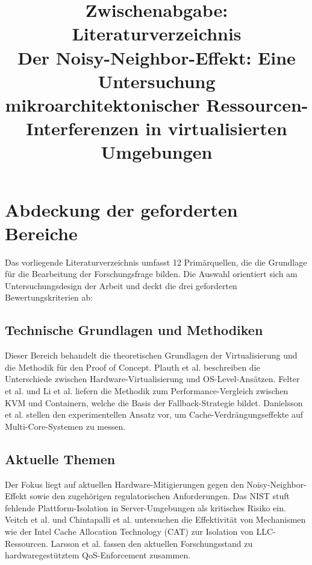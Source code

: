 \documentclass[conference]{IEEEtran}
\begin{document}

\title{Zwischenabgabe: Literaturverzeichnis\\
\large Der Noisy-Neighbor-Effekt: Eine Untersuchung mikroarchitektonischer Ressourcen-Interferenzen in virtualisierten Umgebungen}

\author{%
}

\maketitle

\section{Abdeckung der geforderten Bereiche}
Das vorliegende Literaturverzeichnis umfasst 12 Primärquellen, die die Grundlage für die Bearbeitung der Forschungsfrage bilden. Die Auswahl orientiert sich am Untersuchungsdesign der Arbeit und deckt die drei geforderten Bewertungskriterien ab:

\subsection{Technische Grundlagen und Methodiken}
Dieser Bereich behandelt die theoretischen Grundlagen der Virtualisierung und die Methodik für den Proof of Concept. Plauth et al. \cite{plauth2017performance} beschreiben die Unterschiede zwischen Hardware-Virtualisierung und OS-Level-Ansätzen. Felter et al. \cite{felter2015updated} und Li et al. \cite{li2017performance} liefern die Methodik zum Performance-Vergleich zwischen KVM und Containern, welche die Basis der Fallback-Strategie bildet. Danielsson et al. \cite{danielsson2019testing} stellen den experimentellen Ansatz vor, um Cache-Verdrängungseffekte auf Multi-Core-Systemen zu messen.

\subsection{Aktuelle Themen}
Der Fokus liegt auf aktuellen Hardware-Mitigierungen gegen den Noisy-Neighbor-Effekt sowie den zugehörigen regulatorischen Anforderungen. Das NIST \cite{nist2018hypervisor} stuft fehlende Plattform-Isolation in Server-Umgebungen als kritisches Risiko ein. Veitch et al. \cite{veitch2017performance} und Chintapalli et al. \cite{chintapalli2022numasfp} untersuchen die Effektivität von Mechanismen wie der Intel Cache Allocation Technology (CAT) zur Isolation von LLC-Ressourcen. Larsson et al. \cite{larsson2025esther} fassen den aktuellen Forschungsstand zu hardwaregestütztem QoS-Enforcement zusammen.
\end{document}
